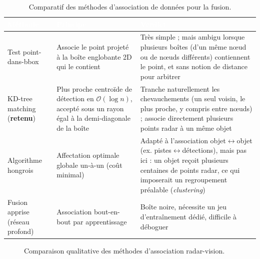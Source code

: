 \documentclass[12pt,a4paper,titlepage]{article}
\newcommand{\hd}[1]{\textcolor{white}{\textbf{#1}}}
\newcommand{\choix}{\rowcolor{tabchoice}}
\begin{document}
\begin{table}[H]
    \centering
    \caption{Comparatif des méthodes d'association de données pour la fusion.}
    \begin{tabularx}{\textwidth}{F{3.4cm}LL}
        \toprule
        \hd{Méthode} & \hd{Principe} & \hd{Verdict} \\
        \midrule
        Test point-dans-bbox & Associe le point projeté à la boîte englobante 2D qui le contient & Très simple ; mais ambigu lorsque plusieurs boîtes (d'un même n\oe ud ou de n\oe uds différents) contiennent le point, et sans notion de distance pour arbitrer \\
        \choix KD-tree matching (\textbf{retenu}) & Plus proche centroïde de détection en $\mathcal{O}(\log n)$, accepté sous un rayon égal à la demi-diagonale de la boîte & Tranche naturellement les chevauchements (un seul voisin, le plus proche, y compris entre n\oe uds) ; associe directement plusieurs points radar à un même objet \\
        Algorithme hongrois & Affectation optimale globale un-à-un (coût minimal) & Adapté à l'association objet$\leftrightarrow$objet (ex. pistes$\leftrightarrow$détections), mais pas ici : un objet reçoit plusieurs centaines de points radar, ce qui imposerait un regroupement préalable (\textit{clustering}) \\
        Fusion apprise (réseau profond) & Association bout-en-bout par apprentissage & Boîte noire, nécessite un jeu d'entraînement dédié, difficile à déboguer \\
        \bottomrule
    \end{tabularx}
\end{table}

\begin{figure}[H]
    \centering
    \caption{Comparaison qualitative des méthodes d'association radar-vision.}
    \label{fig:chart_fusion}
\end{figure}
\end{document}
